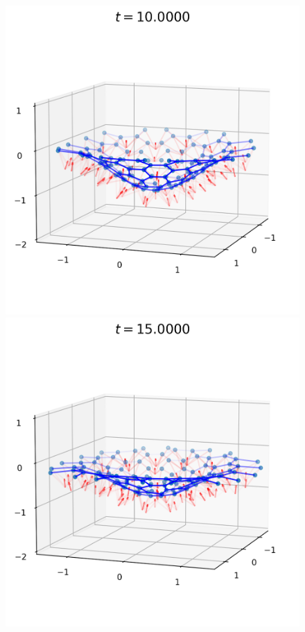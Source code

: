 \begin{landscape}
\begin{figure}[p]
	\includegraphics[width=0.32\textheight]{dynamics/04000.png}
	\includegraphics[width=0.32\textheight]{dynamics/06000.png}

\end{figure}
\end{landscape}
